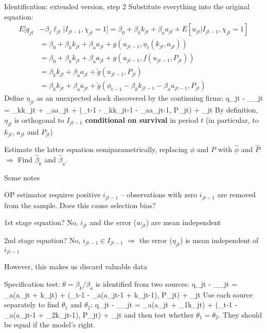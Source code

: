 \begin{frame}{Identification: extended version, step 2}
	Substitute everything into the original equation:
	\begin{align*}
		E[q_{jt} &- \beta_\ell\ell_{jt}| I_{jt-1}, \chi_{jt}=1] = \beta_0 + \beta_kk_{jt} + \beta_aa_{jt} + E[u_{jt}|I_{jt-1}, \chi_{jt}=1]\\
		&= \beta_0 + \beta_kk_{jt} + \beta_aa_{jt} + g(u_{jt-1}, \underline{u}_t(k_{jt}, a_{jt}))\\
		&= \beta_0 + \beta_kk_{jt} + \beta_aa_{jt} + g(u_{jt-1}, f(u_{jt-1}, P_{jt}))\\
		&= \beta_kk_{jt} + \beta_aa_{jt} + \widetilde{g}(u_{jt-1}, P_{jt})\\
		&= \beta_kk_{jt} + \beta_aa_{jt} + \widetilde{g}(\phi_{t-1} - \beta_kk_{jt-1} - \beta_aa_{jt-1}, P_{jt})
	\end{align*}
	Define $\eta_{jt}$ as an unexpected shock discovered by the continuing firms:
	\be
		q_{jt} - \beta_\ell\ell_{jt} = \beta_kk_{jt} + \beta_aa_{jt} + (\phi_{t-1} - \beta_kk_{jt-1} - \beta_aa_{jt-1}, P_{jt}) + \eta_{jt}
	\ee
	By definition, $\eta_{jt}$ is orthogonal to $I_{jt-1}$ \textbf{conditional on survival} in period $t$ (in particular, to $k_{jt}$, $a_{jt}$ and $P_{jt}$)\\\medskip
	
	Estimate the latter equation semiparametrically, replacing $\phi$ and $P$ with $\widehat{\phi}$ and $\widehat{P}$ $\Longrightarrow$ Find $\widehat{\beta}_k$ and $\widehat{\beta}_a$.
\end{frame}

\begin{frame}{Some notes}
	\bi
		\item{OP estimator requires positive $i_{jt-1}$ -- observations with zero $i_{jt-1}$ are removed from the sample. Does this cause selection bias?}
		\bi
			\item{1st stage equation? No, $i_{jt}$ and the error ($w_{jt}$) are mean independent}
			\item{2nd stage equation? No, $i_{jt-1}\in{I_{jt-1}}$ $\Longrightarrow$ the error ($\eta_{jt}$) is mean independent of $i_{jt-1}$}
			\item{However, this makes us discard valuable data}
		\ei
		\item{Specification test: $\theta = \beta_k/\beta_a$ is identified from two sources:}
		\ei
			\be
		q_{jt} - \beta_\ell\ell_{jt} = \beta_a\left(a_{jt} + k_{jt}\right) + \left(\phi_{t-1} - \beta_a\left(a_{jt-1} + k_{jt-1}\right), P_{jt}\right) + \eta_{jt}
			\ee
Use each source separately to find $\theta_1$ and $\theta_2$:
			\be
		q_{jt} - \beta_\ell\ell_{jt} = \beta_a\left(a_{jt} + \theta_1k_{jt}\right) + \left(\phi_{t-1} - \beta_a\left(a_{jt-1} + \theta_2k_{jt-1}\right), P_{jt}\right) + \eta_{jt}
			\ee
and then test whether $\theta_1 = \theta_2$. They should be equal if the model's right.
\end{frame}

